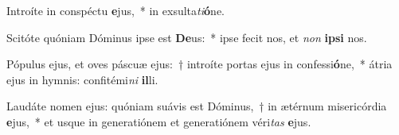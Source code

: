 \item Introíte in conspéctu \textbf{e}jus,~* in exsulta\textit{ti}\textbf{ó}ne.
\item Scitóte quóniam Dóminus ipse est \textbf{De}us:~* ipse fecit nos, et \textit{non} \textbf{ip}\textbf{si} nos.
\item Pópulus ejus, et oves páscuæ ejus:~† introíte portas ejus in confessi\textbf{ó}ne,~* átria ejus in hymnis: confitémi\textit{ni} \textbf{il}li.
\item Laudáte nomen ejus: quóniam suávis est Dóminus,~† in ætérnum misericórdia \textbf{e}jus,~* et usque in generatiónem et generatiónem véri\textit{tas} \textbf{e}jus.
